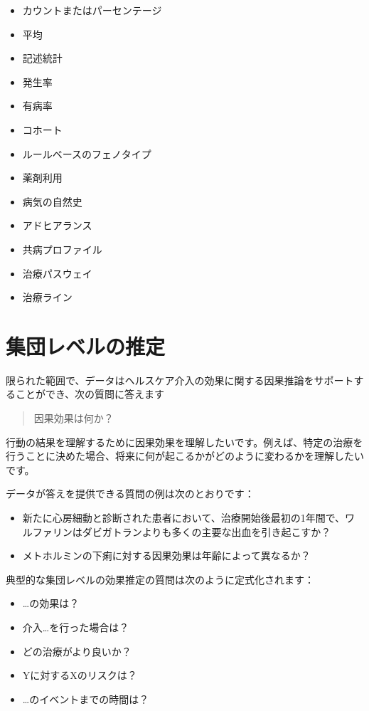 \documentclass[
  11pt]{book}
\providecommand{\tightlist}{%
  \setlength{\itemsep}{0pt}\setlength{\parskip}{0pt}}
\theoremstyle{definition}
\theoremstyle{definition}
\theoremstyle{definition}
\theoremstyle{definition}
\theoremstyle{remark}
\begin{document}
\begin{itemize}
\tightlist
\item
  カウントまたはパーセンテージ
\item
  平均
\item
  記述統計
\item
  発生率
\item
  有病率
\item
  コホート
\item
  ルールベースのフェノタイプ
\item
  薬剤利用
\item
  病気の自然史
\item
  アドヒアランス
\item
  共病プロファイル
\item
  治療パスウェイ
\item
  治療ライン
\end{itemize}

\section{集団レベルの推定}\label{ux96c6ux56e3ux30ecux30d9ux30ebux306eux63a8ux5b9a}


限られた範囲で、データはヘルスケア介入の効果に関する因果推論をサポートすることができ、次の質問に答えます

\begin{quote}
因果効果は何か？
\end{quote}

行動の結果を理解するために因果効果を理解したいです。例えば、特定の治療を行うことに決めた場合、将来に何が起こるかがどのように変わるかを理解したいです。

データが答えを提供できる質問の例は次のとおりです：

\begin{itemize}
\tightlist
\item
  新たに心房細動と診断された患者において、治療開始後最初の1年間で、ワルファリンはダビガトランよりも多くの主要な出血を引き起こすか？
\item
  メトホルミンの下痢に対する因果効果は年齢によって異なるか？
\end{itemize}

典型的な集団レベルの効果推定の質問は次のように定式化されます：

\begin{itemize}
\tightlist
\item
  \ldots の効果は？
\item
  介入\ldots を行った場合は？
\item
  どの治療がより良いか？
\item
  Yに対するXのリスクは？
\item
  \ldots のイベントまでの時間は？
\end{itemize}
\end{document}
